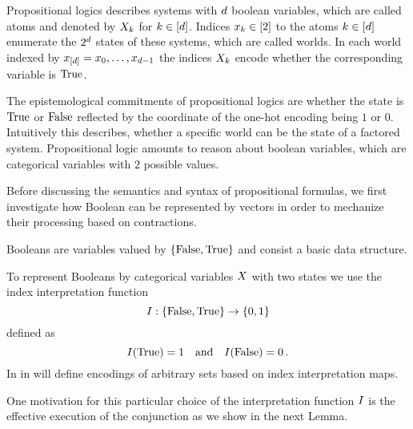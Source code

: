 \chapter{\chatextprobRepresentation}\label{cha:logicalRepresentation}

Propositional logics describes systems with $d$ boolean variables, which are called atoms and denoted by $X_{k}$ for $k\in[d]$.
Indices $x_{k}\in[2]$ to the atoms $k\in[d]$ enumerate the $2^d$ states of these systems, which are called worlds.
In each world indexed by $x_{[d]}=x_{0},\ldots,x_{d-1}$ the indices $X_{k}$ encode whether the corresponding variable is $\mathrm{True}$. 

The epistemological commitments of propositional logics are whether the state is $\mathrm{True}$ or $\mathrm{False}$ reflected by the coordinate of the one-hot encoding being $1$ or $0$.
Intuitively this describes, whether a specific world can be the state of a factored system.
Propositional logic amounts to reason about boolean variables, which are categorical variables with $2$ possible values.


Before discussing the semantics and syntax of propositional formulas, we first investigate how Boolean can be represented by vectors in order to mechanize their processing based on contractions.


Booleans are variables valued by $\{\mathrm{False},\mathrm{True}\}$ and consist a basic data structure.


To represent Booleans by categorical variables $X$ with two states we use the index interpretation function
	\[ I:\{\mathrm{False},\mathrm{True}\}\rightarrow\{0,1\} \]
defined as
    	\[ I(\mathrm{True}) = 1 \quad \text{and} \quad I(\mathrm{False}) = 0 \, . \]
In  in  will define encodings of arbitrary sets based on index interpretation maps.

One motivation for this particular choice of the interpretation function $I$ is the effective execution of the conjunction as we show in the next Lemma.

